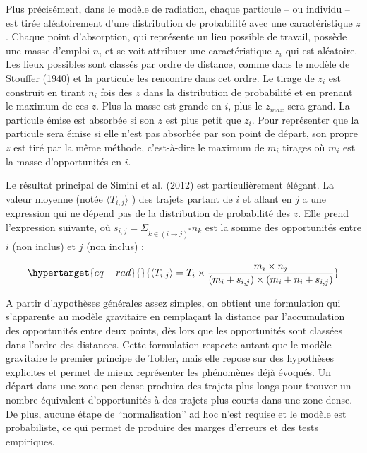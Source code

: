 \documentclass[
  10pt,
  a4paper,
  numbers=noendperiod,
  DIV=9]{scrreprt}
\begin{document}
Plus précisément, dans le modèle de radiation, chaque particule -- ou
individu -- est tirée aléatoirement d'une distribution de probabilité
avec une caractéristique \(z\). Chaque point d'absorption, qui
représente un lieu possible de travail, possède une masse d'emploi
\(n_i\) et se voit attribuer une caractéristique \(z_i\) qui est
aléatoire. Les lieux possibles sont classés par ordre de distance, comme
dans le modèle de Stouffer (1940) et la particule les rencontre dans cet
ordre. Le tirage de \(z_i\) est construit en tirant \(n_i\) fois des
\(z\) dans la distribution de probabilité et en prenant le maximum de
ces \(z\). Plus la masse est grande en \(i\), plus le \(z_{max}\) sera
grand. La particule émise est absorbée si son \(z\) est plus petit que
\(z_i\). Pour représenter que la particule sera émise si elle n'est pas
absorbée par son point de départ, son propre \(z\) est tiré par la même
méthode, c'est-à-dire le maximum de \(m_i\) tirages où \(m_i\) est la
masse d'opportunités en \(i\).

Le résultat principal de Simini et al. (2012) est particulièrement
élégant. La valeur moyenne (notée \(\langle T_{i,j}\rangle\) ) des
trajets partant de \(i\) et allant en \(j\) a une expression qui ne
dépend pas de la distribution de probabilité des \(z\). Elle prend
l'expression suivante, où
\(s_{i,j}=\Sigma_{k \in (i \rightarrow j)^*} n_k\) est la somme des
opportunités entre \(i\) (non inclus) et \(j\) (non inclus) :

\begin{equation}\protect\hypertarget{eq-rad}{}{
\langle T_{i,j}\rangle = T_i \times \frac {m_i \times n_j}{(m_i + s_{i,j}) \times (m_i + n_i +s_{i,j})}
}\label{eq-rad}\end{equation}

A partir d'hypothèses générales assez simples, on obtient une
formulation qui s'apparente au modèle gravitaire en remplaçant la
distance par l'accumulation des opportunités entre deux points, dès lors
que les opportunités sont classées dans l'ordre des distances. Cette
formulation respecte autant que le modèle gravitaire le premier principe
de Tobler, mais elle repose sur des hypothèses explicites et permet de
mieux représenter les phénomènes déjà évoqués. Un départ dans une zone
peu dense produira des trajets plus longs pour trouver un nombre
équivalent d'opportunités à des trajets plus courts dans une zone dense.
De plus, aucune étape de ``normalisation'' ad hoc n'est requise et le
modèle est probabiliste, ce qui permet de produire des marges d'erreurs
et des tests empiriques.
\end{document}
